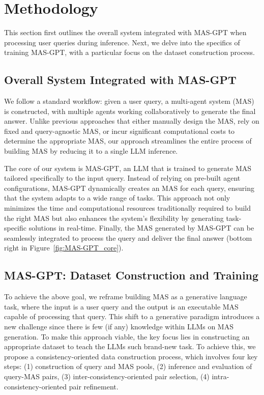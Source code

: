 \documentclass{article}
\theoremstyle{plain}
\theoremstyle{definition}
\theoremstyle{remark}
\begin{document}
\section{Methodology}
\label{sec:method}

This section first outlines the overall system integrated with MAS-GPT when processing user queries during inference.
Next, we delve into the specifics of training MAS-GPT, with a particular focus on the dataset construction process.

\subsection{Overall System Integrated with MAS-GPT}
\label{sec:method_overall}

We follow a standard workflow: given a user query, a multi-agent system (MAS) is constructed, with multiple agents working collaboratively to generate the final answer.
Unlike previous approaches that either manually design the MAS, rely on fixed and query-agnostic MAS, or incur significant computational costs to determine the appropriate MAS, our approach streamlines the entire process of building MAS by reducing it to a single LLM inference.

The core of our system is MAS-GPT, an LLM that is trained to generate MAS tailored specifically to the input query.
Instead of relying on pre-built agent configurations, MAS-GPT dynamically creates an MAS for each query, ensuring that the system adapts to a wide range of tasks.
This approach not only minimizes the time and computational resources traditionally required to build the right MAS but also enhances the system’s flexibility by generating task-specific solutions in real-time.
Finally, the MAS generated by MAS-GPT can be seamlessly integrated to process the query and deliver the final answer (bottom right in Figure~\ref{fig:MAS-GPT_core}).

\subsection{MAS-GPT: Dataset Construction and Training}
\label{sec:method_masgpt}

To achieve the above goal, we reframe building MAS as a generative language task, where the input is a user query and the output is an executable MAS capable of processing that query.
This shift to a generative paradigm introduces a new challenge since there is few (if any) knowledge within LLMs on MAS generation.
To make this approach viable, the key focus lies in constructing an appropriate dataset to teach the LLMs such brand-new task.
To achieve this, we propose a consistency-oriented data construction process, which involves four key steps:
(1) construction of query and MAS pools,
(2) inference and evaluation of query-MAS pairs,
(3) inter-consistency-oriented pair selection,
(4) intra-consistency-oriented pair refinement.
\end{document}
